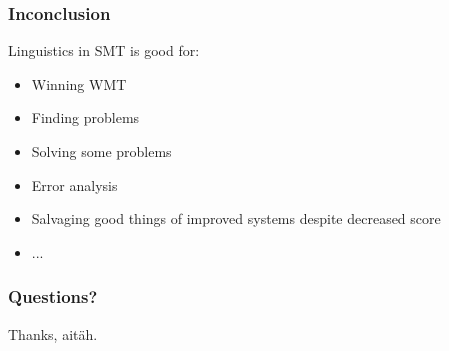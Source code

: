 \documentclass{beamer}
\begin{document}
\begin{frame}
    \frametitle{Inconclusion}
    Linguistics in SMT is good for:
    \begin{itemize}
        \item Winning WMT
        \item Finding problems
        \item Solving some problems
        \item Error analysis
        \item Salvaging good things of improved
            systems despite decreased score
        \item ...
    \end{itemize}
\end{frame}

\begin{frame}
    \frametitle{Questions?}
    Thanks, aitäh.
\end{frame}
\end{document}
